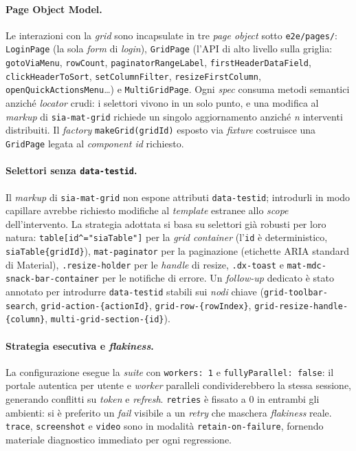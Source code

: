 \paragraph{Page Object Model.} Le interazioni con la \emph{grid} sono incapsulate in tre \emph{page object} sotto \texttt{e2e/pages/}: \texttt{LoginPage} (la sola \emph{form} di \emph{login}), \texttt{GridPage} (l'API di alto livello sulla griglia: \texttt{gotoViaMenu}, \texttt{rowCount}, \texttt{paginatorRangeLabel}, \texttt{firstHeaderDataField}, \texttt{clickHeaderToSort}, \texttt{setColumnFilter}, \texttt{resizeFirstColumn}, \texttt{openQuickActionsMenu}\dots) e \texttt{MultiGridPage}. Ogni \emph{spec} consuma metodi semantici anziché \emph{locator} crudi: i selettori vivono in un solo punto, e una modifica al \emph{markup} di \texttt{sia-mat-grid} richiede un singolo aggiornamento anziché \emph{n} interventi distribuiti. Il \emph{factory} \texttt{makeGrid(gridId)} esposto via \emph{fixture} costruisce una \texttt{GridPage} legata al \emph{component id} richiesto.

\paragraph{Selettori senza \texttt{data-testid}.} Il \emph{markup} di \texttt{sia-mat-grid} non espone attributi \texttt{data-testid}; introdurli in modo capillare avrebbe richiesto modifiche al \emph{template} estranee allo \emph{scope} dell'intervento. La strategia adottata si basa su selettori già robusti per loro natura: \texttt{table[id\textasciicircum="siaTable"]} per la \emph{grid container} (l'\texttt{id} è deterministico, \texttt{siaTable\{gridId\}}), \texttt{mat-paginator} per la paginazione (etichette ARIA standard di Material), \texttt{.resize-holder} per le \emph{handle} di resize, \texttt{.dx-toast} e \texttt{mat-mdc-snack-bar-container} per le notifiche di errore. Un \emph{follow-up} dedicato è stato annotato per introdurre \texttt{data-testid} stabili sui \emph{nodi} chiave (\texttt{grid-toolbar-search}, \texttt{grid-action-\{actionId\}}, \texttt{grid-row-\{rowIndex\}}, \texttt{grid-resize-handle-\{column\}}, \texttt{multi-grid-section-\{id\}}).

\paragraph{Strategia esecutiva e \emph{flakiness}.} La configurazione esegue la \emph{suite} con \texttt{workers: 1} e \texttt{fullyParallel: false}: il portale autentica per utente e \emph{worker} paralleli condividerebbero la stessa sessione, generando conflitti su \emph{token} e \emph{refresh}. \texttt{retries} è fissato a $0$ in entrambi gli ambienti: si è preferito un \emph{fail} visibile a un \emph{retry} che maschera \emph{flakiness} reale. \texttt{trace}, \texttt{screenshot} e \texttt{video} sono in modalità \texttt{retain-on-failure}, fornendo materiale diagnostico immediato per ogni regressione.

